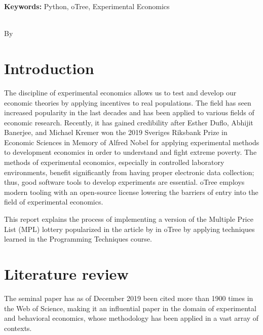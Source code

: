 \documentclass [12pt,a4paper,oneside]{article}
\begin{document}
 \textbf{Keywords:} Python, oTree, Experimental Economics
 
 \clearpage


 \makeatother



	\newpage %
	\thispagestyle{plain}%



\makeatletter	
\begin{center} %

\textsc{\@title}\\ %
    
By \@author \\
    

\end{center} %
\makeatother



\section{Introduction}\label{sec:introduction}
The discipline of experimental economics allows us to test and develop our economic theories by applying incentives to real populations. The field has seen increased popularity in the last decades and has been applied to various fields of economic research. Recently, it has gained credibility after Esther Duflo, Abhijit Banerjee, and Michael Kremer won the 2019 Sveriges Riksbank Prize in Economic Sciences in Memory of Alfred Nobel for applying experimental methods to development economics in order to understand and fight extreme poverty. 
The methods of experimental economics, especially in controlled laboratory environments, benefit significantly from having proper electronic data collection; thus, good software tools to develop experiments are essential. oTree \parencite{chen_otreeopen-source_2016} employs modern tooling with an open-source license lowering the barriers of entry into the field of experimental economics. 

This report explains the process of implementing a version of the Multiple Price List (MPL) lottery popularized in the  article by \cite{holt_risk_2002} in oTree by applying techniques learned in the Programming Techniques course.

 


\section{Literature review}
The seminal paper has as of December 2019 been cited more than 1900 times in the Web of Science, making it an influential paper in the domain of experimental and behavioral economics, whose methodology has been applied in a vast array of contexts. 
\end{document}
